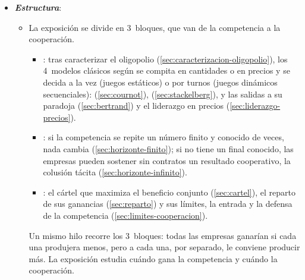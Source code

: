 \documentclass[11pt]{article}
\begin{document}
\begin{itemize}
\item \textbf{\emph{Estructura}}:
  \begin{itemize}
  \item La exposición se divide en 3~bloques, que van de la competencia a la cooperación.
  \begin{itemize}
  \item {}: tras caracterizar el oligopolio (\ref{sec:caracterizacion-oligopolio}), los 4~modelos clásicos según se compita en cantidades o en precios y se decida a la vez (juegos estáticos) o por turnos (juegos dinámicos secuenciales):  (\ref{sec:cournot}),  (\ref{sec:stackelberg}),  y las salidas a su paradoja (\ref{sec:bertrand}) y el liderazgo en precios (\ref{sec:liderazgo-precios}).
  \item {}: si la competencia se repite un número finito y conocido de veces, nada cambia (\ref{sec:horizonte-finito}); si no tiene un final conocido, las empresas pueden sostener sin contratos un resultado cooperativo, la colusión tácita (\ref{sec:horizonte-infinito}).
  \item {}: el cártel que maximiza el beneficio conjunto (\ref{sec:cartel}), el reparto de sus ganancias (\ref{sec:reparto}) y sus límites, la entrada y la defensa de la competencia (\ref{sec:limites-cooperacion}).
  \end{itemize}
  Un mismo hilo recorre los 3~bloques: todas las empresas ganarían si cada una produjera menos, pero a cada una, por separado, le conviene producir más. La exposición estudia cuándo gana la competencia y cuándo la cooperación.
  \end{itemize}
\end{itemize}
\end{document}

